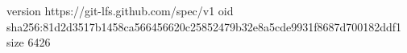 version https://git-lfs.github.com/spec/v1
oid sha256:81d2d3517b1458ca566456620c25852479b32e8a5cde9931f8687d700182ddf1
size 6426
